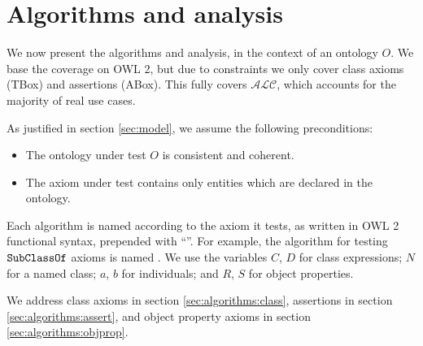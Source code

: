 \documentclass[paper.tex]{subfiles}
\begin{document}
\section{Algorithms and analysis}
\label{sec:algorithms}

We now present the algorithms and analysis, in the context of an ontology $O$.  We base the coverage on OWL 2, but due to constraints we only cover class axioms (TBox) and assertions (ABox).  This fully covers $\mathcal{ALC}$, which accounts for the majority of real use cases.  

As justified in section \ref{sec:model}, we assume the following preconditions:
\begin{itemize}[nosep]
  \item The ontology under test $O$ is consistent and coherent.
  \item The axiom under test contains only entities which are declared in the ontology.
\end{itemize}

Each algorithm is named according to the axiom it tests, as written in OWL 2 functional syntax, prepended with ``''.  For example, the algorithm for testing $\mathtt{SubClassOf}$ axioms is named .  We use the variables $C$, $D$ for class expressions; $N$ for a named class; $a$, $b$ for individuals; and $R$, $S$ for object properties.  \todo[move]

We address class axioms in section \ref{sec:algorithms:class}, assertions in section \ref{sec:algorithms:assert}, and object property axioms in section \ref{sec:algorithms:objprop}.  \todo[check]




\end{document}

